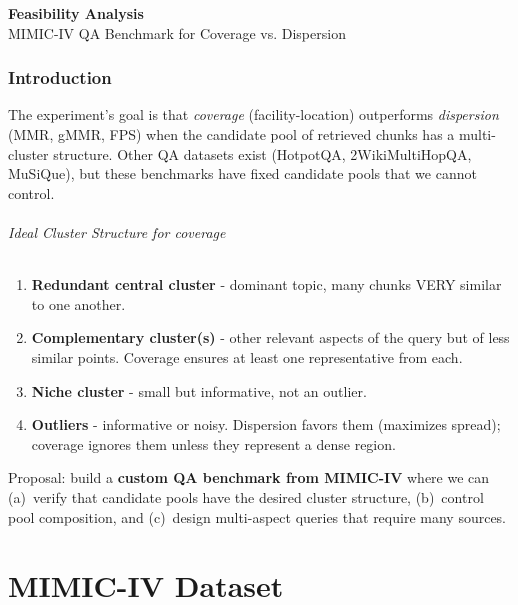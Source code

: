 \documentclass[11pt,a4paper]{article}
\begin{document}
\begin{center}
	{\huge \textbf{Feasibility Analysis}}\\[1em]
	{\Large MIMIC-IV QA Benchmark for Coverage vs. Dispersion}\\[4em]
\end{center}

\tableofcontents
\newpage

\section{Introduction}
\label{sec:introduction}

The experiment's goal is that \emph{coverage} (facility-location) outperforms \emph{dispersion} (MMR, gMMR, FPS) when the candidate pool of retrieved chunks has a multi-cluster structure. Other QA datasets exist (HotpotQA, 2WikiMultiHopQA, MuSiQue), but these benchmarks have fixed candidate pools that we cannot control.

\paragraph{Ideal Cluster Structure for coverage}
\begin{enumerate}[leftmargin=*]
	\item \textbf{Redundant central cluster} - dominant topic, many chunks VERY similar to one another.
	\item \textbf{Complementary cluster(s)} - other relevant aspects of the query but of less similar points. Coverage ensures at least one representative from each.
	\item \textbf{Niche cluster} - small but informative, not an outlier.
	\item \textbf{Outliers} - informative or noisy.  Dispersion favors them (maximizes spread); coverage ignores them unless they represent a dense region.
\end{enumerate}

Proposal: build a \textbf{custom QA benchmark from MIMIC-IV} where we can (a)~verify that candidate pools have the desired cluster structure, (b)~control pool composition, and (c)~design multi-aspect queries that require many sources.

\part{MIMIC-IV Dataset}
\label{sec:data}
\end{document}
